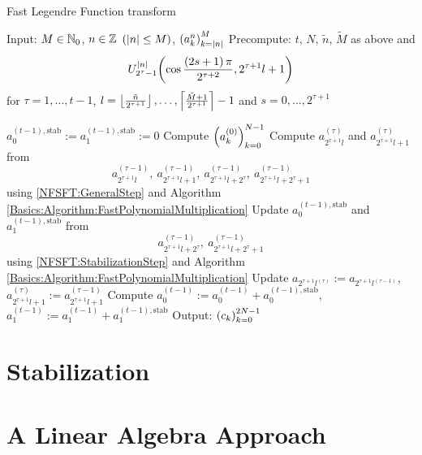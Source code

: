 \begin{algorithm}[ht]
  \caption{Fast Legendre Function transform}
  \label{NFSFT:Algorithm:FLFT}    
  \begin{algorithmic}
    \STATE Input:  $M \in \mathbb{N}_{0}$, $n \in \mathbb{Z}$ $(\left\vert n\right\vert \le M)$, $\left(a_k^n\right)_{k=\left\vert n\right\vert}^{M}$
    \STATE Precompute: $t$, $N$, $\tilde{n}$, $\tilde{M}$ as above and $$U_{2^{\tau}-1}^{\left\vert n\right\vert}{\hspace{-0.4ex}}\left(\cos \frac{\left(2s+1\right)\pi}{2^{\tau+2}}, 2^{\tau+1}l+1\right)$$ 
    \STATE {} for $\tau = 1,\ldots,t-1$, $l = \left\lfloor\frac{\tilde{n}}{2^{\tau+1}}\right\rfloor,\ldots,\left\lceil\frac{\tilde{M}+1}{2^{\tau+1}}\right\rceil-1$ and $s = 0,\ldots,2^{\tau+1}$
    \STATE {} 

    \STATE $a_{0}^{(t-1),\text{stab}} := a_{1}^{(t-1),\text{stab}} := 0$
    \STATE Compute $\left(a_{k}^{(0)}\right)_{k=0}^{N-1}$ 
          \STATE Compute $a_{2^{\tau+1}l}^{(\tau)}$ and $a_{2^{\tau+1}l+1}^{(\tau)}$ from $$a_{2^{\tau+1}l}^{(\tau-1)},\  
            a_{2^{\tau+1}l+1}^{(\tau-1)},\ a_{2^{\tau+1}l+2^{\tau}}^{(\tau-1)},\ a_{2^{\tau+1}l+2^{\tau}+1}^{(\tau-1)}$$ using 
            \eqref{NFSFT:GeneralStep} and Algorithm \ref{Basics:Algorithm:FastPolynomialMultiplication}
        \ELSE
          \STATE Update $a_{0}^{(t-1),\text{stab}}$ and $a_{1}^{(t-1),\text{stab}}$ from
            $$ 
              a_{2^{\tau+1}l+2^{\tau}}^{(\tau-1)},\ a_{2^{\tau+1}l+2^{\tau}+1}^{(\tau-1)}
            $$ 
            using \eqref{NFSFT:StabilizationStep} and Algorithm \ref{Basics:Algorithm:FastPolynomialMultiplication}
          \STATE Update $a_{2^{\tau+1}l^{(\tau)}} := a_{2^{\tau+1}l^{(\tau-1)}}$, $a_{2^{\tau+1}l+1}^{(\tau)} := a_{2^{\tau+1}l+1}^{(\tau-1)}$
        \ENDIF
      \ENDFOR
    \ENDFOR
    \STATE Compute $a_{0}^{(t-1)} := a_{0}^{(t-1)} + a_{0}^{(t-1),\text{stab}}$, $a_{1}^{(t-1)} := a_{1}^{(t-1)} + a_{1}^{(t-1),\text{stab}}$
    \STATE Output: $\left(c_{k}\right)_{k=0}^{2N-1}$
\end{algorithmic}
\end{algorithm}

\section{Stabilization}
\label{DSFT:Stabilization}

\section{A Linear Algebra Approach}
\label{DSFT:LinearAlgebra}

